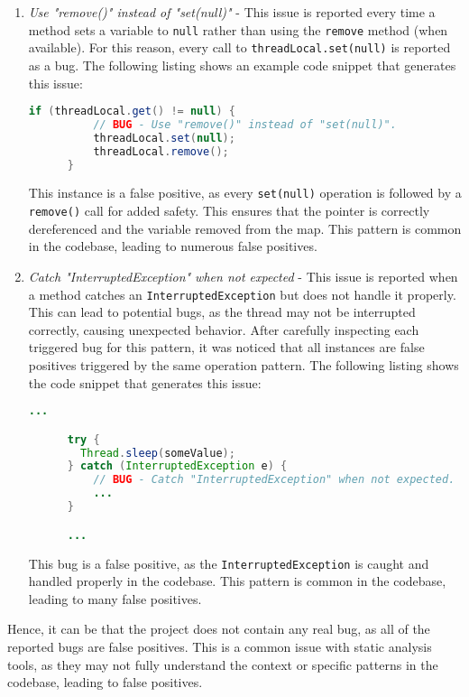 \begin{enumerate}
	\item \textit{Use "remove()" instead of "set(null)"} - This issue is reported every time a method sets a variable to \texttt{null} rather than using the \texttt{remove} method (when available). For this reason, every call to \texttt{threadLocal.set(null)} is reported as a bug. The following listing shows an example code snippet that generates this issue:

	      \begin{lstlisting}[language=Java]
      if (threadLocal.get() != null) {
          // BUG - Use "remove()" instead of "set(null)".
          threadLocal.set(null);
          threadLocal.remove();
      }
    \end{lstlisting}

	      \noindent This instance is a false positive, as every \texttt{set(null)} operation is followed by a \texttt{remove()} call for added safety. This ensures that the pointer is correctly dereferenced and the variable removed from the map. This pattern is common in the codebase, leading to numerous false positives.

	\item \textit{Catch "InterruptedException" when not expected} - This issue is reported when a method catches an \texttt{InterruptedException} but does not handle it properly. This can lead to potential bugs, as the thread may not be interrupted correctly, causing unexpected behavior. After carefully inspecting each triggered bug for this pattern, it was noticed that all instances are false positives triggered by the same operation pattern. The following listing shows the code snippet that generates this issue:
	      \begin{lstlisting}[language=Java]
      ...

      try {
        Thread.sleep(someValue);
      } catch (InterruptedException e) {
          // BUG - Catch "InterruptedException" when not expected.
          ...
      }

      ...
    \end{lstlisting}
	      \noindent This bug is a false positive, as the \texttt{InterruptedException} is caught and handled properly in the codebase. This pattern is common in the codebase, leading to many false positives.
\end{enumerate}

\noindent Hence, it can be that the project does not contain any real bug, as all of the reported bugs are false positives. This is a common issue with static analysis tools, as they may not fully understand the context or specific patterns in the codebase, leading to false positives.

